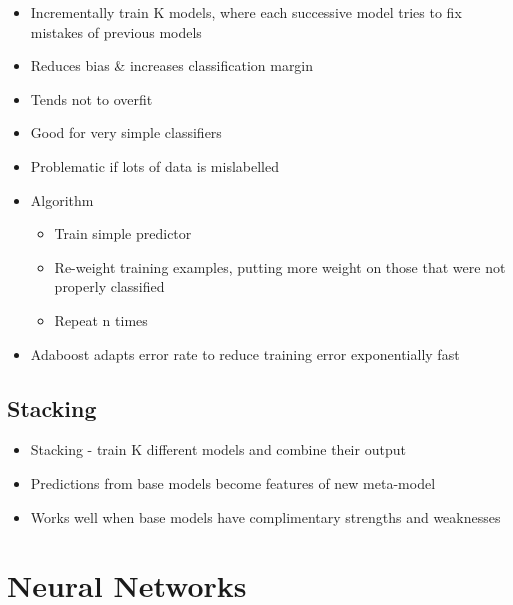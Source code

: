 \documentclass[12pt]{article}
\begin{document}
\begin{itemize}
	\item Incrementally train K models, where each successive model tries to fix mistakes of previous models
	\item Reduces bias \& increases classification margin
	\item Tends not to overfit 
	\item Good for very simple classifiers
	\item Problematic if lots of data is mislabelled
	\item Algorithm 
	\begin{itemize}
		\item Train simple predictor
		\item Re-weight training examples, putting more weight on those that were not properly classified 
		\item Repeat n times
	\end{itemize}
	\item Adaboost adapts error rate to reduce training error exponentially fast
\end{itemize}

\subsection{Stacking}

\begin{itemize}
	\item Stacking - train K different models and combine their output
	\item Predictions from base models become features of new meta-model
	\item Works well when base models have complimentary strengths and weaknesses
\end{itemize}

\section{Neural Networks}
\end{document}
